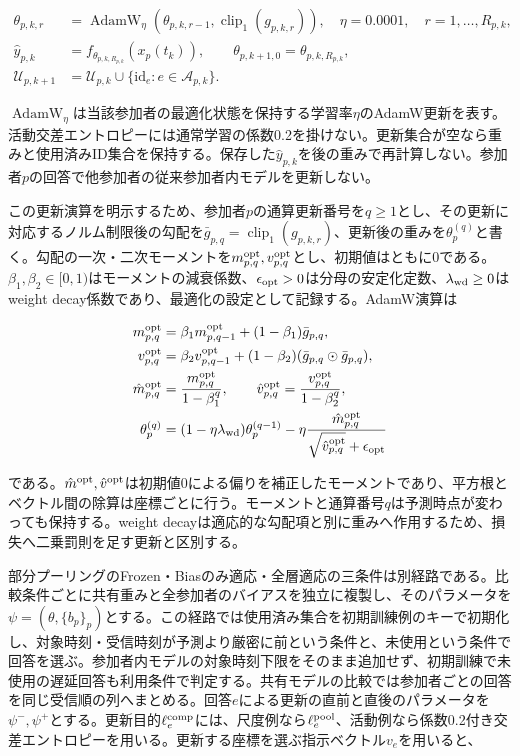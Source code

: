 \[
\begin{aligned}
\theta_{p,k,r}
&=\operatorname{AdamW}_{\eta}(\theta_{p,k,r-1},\operatorname{clip}_1(g_{p,k,r})),
\quad
\eta=0.0001,\quad r=1,\ldots,R_{p,k},\\
\hat y_{p,k}
&=f_{\theta_{p,k,R_{p,k}}}(x_p(t_k)),\qquad
\theta_{p,k+1,0}=\theta_{p,k,R_{p,k}},\\
\mathcal U_{p,k+1}
&=\mathcal U_{p,k}\cup\{\mathrm{id}_e:e\in\mathcal A_{p,k}\}.
\end{aligned}
\]

\(\operatorname{AdamW}_{\eta}\)は当該参加者の最適化状態を保持する学習率\(\eta\)のAdamW更新を表す。活動交差エントロピーには通常学習の係数0.2を掛けない。更新集合が空なら重みと使用済みID集合を保持する。保存した\(\hat y_{p,k}\)を後の重みで再計算しない。参加者\(p\)の回答で他参加者の従来参加者内モデルを更新しない。

この更新演算を明示するため、参加者\(p\)の通算更新番号を\(q\ge1\)とし、その更新に対応するノルム制限後の勾配を\(\bar g_{p,q}=\operatorname{clip}_1(g_{p,k,r})\)、更新後の重みを\(\theta_p^{(q)}\)と書く。勾配の一次・二次モーメントを\(m_{p,q}^{\rm opt},v_{p,q}^{\rm opt}\)とし、初期値はともに0である。\(\beta_1,\beta_2\in[0,1)\)はモーメントの減衰係数、\(\epsilon_{\rm opt}>0\)は分母の安定化定数、\(\lambda_{\rm wd}\ge0\)はweight decay係数であり、最適化の設定として記録する。AdamW演算は

\[
\begin{aligned}
m_{p,q}^{\rm opt}
&=\beta_1m_{p,q-1}^{\rm opt}+(1-\beta_1)\bar g_{p,q},\\
v_{p,q}^{\rm opt}
&=\beta_2v_{p,q-1}^{\rm opt}
+(1-\beta_2)(\bar g_{p,q}\odot\bar g_{p,q}),\\
\hat m_{p,q}^{\rm opt}
&=\frac{m_{p,q}^{\rm opt}}{1-\beta_1^q},\qquad
\hat v_{p,q}^{\rm opt}=\frac{v_{p,q}^{\rm opt}}{1-\beta_2^q},\\
\theta_p^{(q)}
&=(1-\eta\lambda_{\rm wd})\theta_p^{(q-1)}
-\eta\frac{\hat m_{p,q}^{\rm opt}}
{\sqrt{\hat v_{p,q}^{\rm opt}}+\epsilon_{\rm opt}}
\end{aligned}
\]

である。\(\hat m^{\rm opt},\hat v^{\rm opt}\)は初期値0による偏りを補正したモーメントであり、平方根とベクトル間の除算は座標ごとに行う。モーメントと通算番号\(q\)は予測時点が変わっても保持する。weight decayは適応的な勾配項と別に重みへ作用するため、損失へ二乗罰則を足す更新と区別する。

部分プーリングのFrozen・Biasのみ適応・全層適応の三条件は別経路である。比較条件ごとに共有重みと全参加者のバイアスを独立に複製し、そのパラメータを\(\psi=(\theta,\{b_p\}_p)\)とする。この経路では使用済み集合を初期訓練例のキーで初期化し、対象時刻・受信時刻が予測より厳密に前という条件と、未使用という条件で回答を選ぶ。参加者内モデルの対象時刻下限をそのまま追加せず、初期訓練で未使用の遅延回答も利用条件で判定する。共有モデルの比較では参加者ごとの回答を同じ受信順の列へまとめる。回答\(e\)による更新の直前と直後のパラメータを\(\psi^{-},\psi^{+}\)とする。更新目的\(\ell_e^{\rm comp}\)には、尺度例なら\(\ell_e^{\rm pool}\)、活動例なら係数0.2付き交差エントロピーを用いる。更新する座標を選ぶ指示ベクトル\(v_e\)を用いると、

